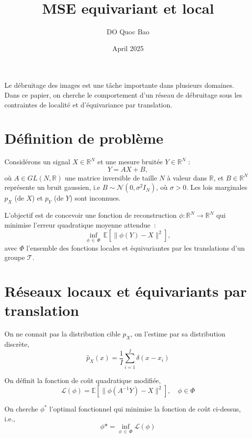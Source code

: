 \documentclass[a4paper,10pt]{article}
\title{MSE equivariant et local}
\author{DO Quoc Bao}
\date{April 2025}
\theoremstyle{definition} %
\theoremstyle{definition} %
\theoremstyle{definition} %
\theoremstyle{definition} %
\newcommand{\R}{\mathbb{R}}
\begin{document}
\maketitle

Le débruitage des images est une tâche importante dans plusieurs domaines. Dans ce papier, on cherche le comportement d'un réseau de débruitage sous les contraintes de localité et d'équivariance par translation. 

\section{Définition de problème}
Considérons un signal \( X \in \mathbb{R}^N \) et une mesure bruitée \( Y \in \mathbb{R}^N \) :  
\[
Y = A X + B,
\]  
où \( A \in GL(N,\R) \) une matrice inversible de taille $N$ à valeur dans $\R$, et \( B \in \mathbb{R}^N \) représente un bruit gaussien, i.e \( B \sim \mathcal{N}(0, \sigma^{2} I_N) \), où \( \sigma > 0 \). Les lois marginales \( p_X \) (de \( X \)) et \( p_Y \) (de \( Y \)) sont inconnues.  

L'objectif est de concevoir une fonction de reconstruction \( \phi : \mathbb{R}^N \to \mathbb{R}^N \) qui minimise l'erreur quadratique moyenne attendue :  
\[
\inf_{\phi\,\in\, \Phi} \, \mathbb{E} \left[ \| \phi(Y) - X \|^2 \right],
\] 
avec $\Phi$ l'ensemble des fonctions locales et équivariantes par les translations d'un groupe $\mathcal{T}$.


\section{Réseaux locaux et équivariants par translation}
On ne connait pas la distribution cible $p_X$, on l'estime par sa distribution discrète,
\begin{equation*}
    \hat p_X(x) = \frac{1}{I}\sum\limits_{i=1}^I \delta(x-x_i)
\end{equation*}

On définit la fonction de coût quadratique modifiée,
\begin{equation}
    \mathcal{L}(\phi) = \mathbb{E} \left[ \| \phi(A^{-1}Y) - X \|^2 \right], \quad \phi \in \Phi
\end{equation}

On cherche $\phi^*$ l'optimal fonctionnel qui minimise la fonction de coût ci-dessus, i.e.,
\begin{equation*}
    \phi* = \inf_{\phi\,\in\, \Phi} \mathcal{L}(\phi)
\end{equation*}
\end{document}
